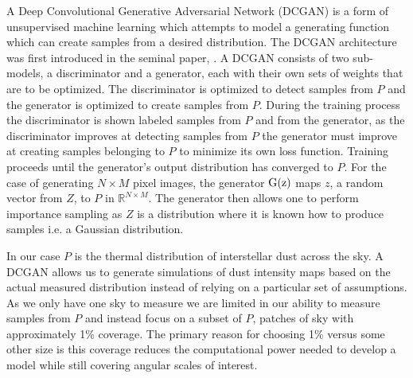 \documentclass[twocolumn]{aastex62}
\begin{document}
A Deep Convolutional Generative Adversarial Network (DCGAN) is a form of unsupervised machine learning which attempts to model a generating function which can create samples from a desired distribution. The DCGAN architecture was first introduced in the seminal paper, \cite{goodfellow14}.
A DCGAN consists of two sub-models, a discriminator and a generator, each with their own sets of weights that are to be optimized.
The discriminator is optimized to detect samples from $P$ and the generator is optimized to create samples from $P$.
During the training process the discriminator is shown labeled samples from $P$ and from the generator, as the discriminator improves at detecting samples from $P$ the generator must improve at creating samples belonging to $P$ to minimize its own loss function. Training proceeds until the generator's output distribution has converged to $P$.
For the case of generating $N\times M$ pixel images, the generator $\rm{G}(z)$ maps $z$, a random vector from $Z$, to $P$ in $\mathbb{R}^{N\times M}$. 
The generator then allows one to perform importance sampling as $Z$ is a distribution where it is known how to produce samples i.e. a Gaussian distribution.

In our case $P$ is the thermal distribution of interstellar dust across the sky.
A DCGAN allows us to generate simulations of dust intensity maps based on the actual measured distribution instead of relying on a particular set of assumptions. 
As we only have one sky to measure we are limited in our ability to measure samples from $P$ and instead focus on a subset of $P$, patches of sky with approximately 1\% coverage. 
The primary reason for choosing 1\% versus some other size is this coverage reduces the computational power needed to develop a model while still covering angular scales of interest.
\end{document}
